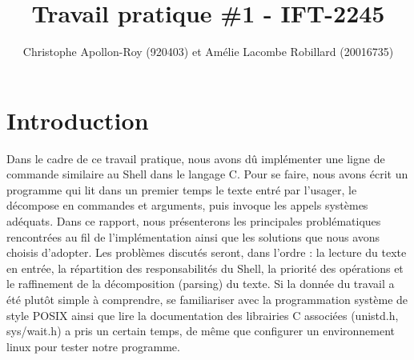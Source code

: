 \documentclass{article}
\title{Travail pratique \#1 - IFT-2245}
\author{Christophe Apollon-Roy (920403) et Amélie Lacombe Robillard (20016735)}
\begin{document}
\maketitle
\section*{ Introduction }
Dans le cadre de ce travail pratique, nous avons dû implémenter une ligne de commande similaire au Shell dans le langage C. Pour se faire, nous avons écrit un programme qui lit dans un premier temps le texte entré par l’usager, le décompose en commandes et arguments, puis invoque les appels systèmes adéquats. Dans ce rapport, nous présenterons les principales problématiques rencontrées au fil de l’implémentation ainsi que les solutions que nous avons choisis d’adopter. Les problèmes discutés seront, dans l’ordre : la lecture du texte en entrée, la répartition des responsabilités du Shell, la priorité des opérations et le raffinement de la décomposition (parsing) du texte.
 Si la donnée du travail a été plutôt simple à comprendre, se familiariser avec la programmation système de style POSIX ainsi que lire la documentation des librairies C associées (unistd.h, sys/wait.h) a pris un certain temps, de même que configurer un environnement linux pour tester notre programme. 
\end{document}
